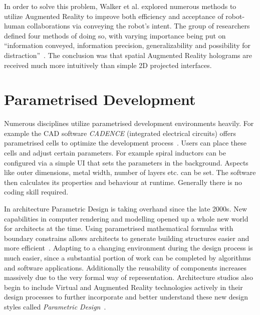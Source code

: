 In order to solve this problem, Walker et al. \cite{walker2018communicating} explored numerous methods to utilize Augmented Reality to improve both efficiency and acceptance of robot-human collaborations via conveying the robot's intent. The group of researchers defined four methods of doing so, with varying importance being put on “information conveyed, information precision, generalizability and possibility for distraction”~\cite{walker2018communicating}. The conclusion was that spatial Augmented Reality holograms are received much more intuitively than simple 2D projected interfaces.

\section{Parametrised Development}\label{Section:ParametricDesignIntoduction}
Numerous disciplines utilize parametrised development environments heavily. For example the CAD software \textit{CADENCE} (integrated electrical circuits) offers parametrised cells to optimize the development process~\cite{parametrizedCellElectricalInductor}. Users can place these cells and adjust certain parameters. For example spiral inductors can be configured via a simple UI that sets the parameters in the background. Aspects like outer dimensions, metal width, number of layers etc. can be set. The software then calculates its properties and behaviour at runtime. Generally there is no coding skill required.

In architecture Parametric Design is taking overhand since the late 2000s. New capabilities in computer rendering and modelling opened up a whole new world for architects at the time. Using parametrised mathematical formulas with boundary constrains allows architects to generate building structures easier and more efficient~\cite{stavric2011parametric}. Adapting to a changing environment during the design process is much easier, since a substantial portion of work can be completed by algorithms and software applications. Additionally the reusability of  components increases massively due to the very formal way of representation. Architecture studios also begin to include Virtual and Augmented Reality technologies actively in their design processes to further incorporate and better understand these new design styles called \textit{Parametric Design}~\cite{seichterDigitalDesignArch, salimSystemArchMR, wangFrameworkMXBIM}. 


